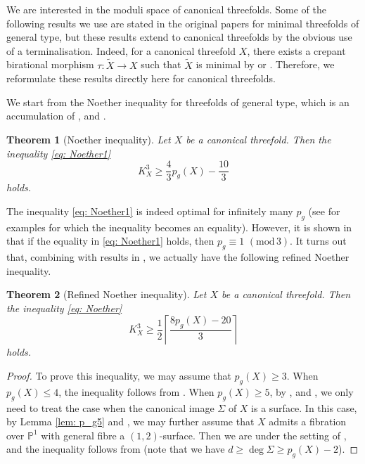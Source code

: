 \documentclass[a4paper,11pt]{amsart}
\newcommand{\PP}{\ensuremath{\mathbb{P}}}
\newtheorem{thm}{Theorem}[section]
\theoremstyle{definition}
\theoremstyle{remark}
\numberwithin{equation}{section}
\begin{document}
We are interested in the moduli space of canonical threefolds. Some of the following results we use are stated in the original papers for minimal threefolds of general type, but these results extend to canonical threefolds by the obvious use of a terminalisation. Indeed, for a canonical threefold $X$, there exists a crepant birational morphism $\tau \colon \tilde{X} \to X$ such that $\tilde{X}$ is minimal by \cite{Kaw88} or \cite[Theorem 6.25]{KM}. Therefore, we reformulate these results directly here for canonical threefolds. 

We start from the Noether inequality for threefolds of general type, which is an accumulation of \cite[Theorem 1.1]{CCJ}, \cite[Theorem 1]{CCJAdd} and \cite[Theorem 1.1]{CHJ}.
\begin{thm}[Noether inequality] \label{thm: Noether1}
	Let $X$ be a canonical threefold. Then the inequality \eqref{eq: Noether1}
	\[
	K_X^3 \ge \frac{4}{3}p_g(X) - \frac{10}{3}
	\]
    holds.
\end{thm}
The inequality \eqref{eq: Noether1} is indeed optimal for infinitely many $p_g$ (see \cite{Kobayashi,CH,CP,CJL,HZ} for examples for which the inequality becomes an equality). However, it is shown in \cite[Theorem 1.2]{HZ} that if the equality in \eqref{eq: Noether1} holds, then $p_g \equiv 1$ $(\mathrm{mod}\, 3)$. It turns out that, combining with results in \cite{HZ}, we actually have the following refined Noether inequality.

\begin{thm}[Refined Noether inequality] \label{thm: Noether}
	Let $X$ be a canonical threefold. Then the inequality \eqref{eq: Noether}
    \[
	K_X^3 \ge \frac{1}{2} \left \lceil {\frac{8p_g(X) - 20}{3}} \right \rceil
    \]
    holds.
\end{thm}

\begin{proof}
    To prove this inequality, we may assume that $p_g(X) \ge 3$. When $p_g(X) \le 4$, the inequality follows from \cite[Theorem 1.5]{Chen}. When $p_g(X) \ge 5$, by \cite[Theorem 2.4]{Kobayashi}, \cite[Theorem 4.4 and 4.5]{CCJ} and \cite[Theorem 4.6]{CHJ}, we only need to treat the case when the canonical image $\Sigma$ of $X$ is a surface. In this case, by  Lemma \ref{lem: p_g5} and \cite[Proposition 2.1]{HZ}, we may further assume that $X$ admits a fibration over $\PP^1$ with general fibre a $(1,2)$-surface. Then we are under the setting of \cite[\S 3]{HZ}, and the inequality follows from \cite[Proposition 3.5(2)]{HZ} (note that we have $d \geq \deg\Sigma \geq p_g(X)-2$).
\end{proof}
\end{document}
